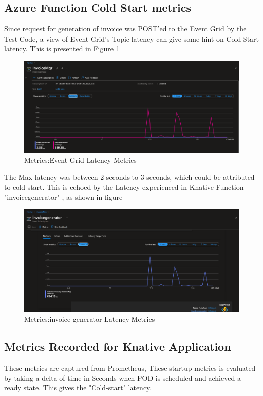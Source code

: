 \documentclass{article}
\begin{document}
\begin{flushleft}
\subsection{Azure Function Cold Start metrics}
Since request for generation of invoice was POST'ed to the Event Grid by the Test Code, a view of Event Grid's Topic latency can give some hint on Cold Start latency. This is presented in Figure \ref{event_grid_latency_metrics}

\begin{figure}[h]
    \centering
    \includegraphics[scale=0.20]{images/AzurePerfCapture/eventgrid-topic-latency.PNG}
    \caption{Metrics:Event Grid Latency Metrics}
    \label{event_grid_latency_metrics}
\end{figure}
\par
The Max latency was between 2 seconds to 3 seconds, which could be attributed to cold start. This is echoed by the Latency experienced in Knative Function "invoicegenerator" , as shown in figure 
\begin{figure}[h]
    \centering
    \includegraphics[scale=0.20]{images/AzurePerfCapture/invoicegenerator-event-latency.PNG}
    \caption{Metrics:invoice generator Latency Metrics}
    \label{invoice-generator_latency_metrics}
\end{figure}
\par
\subsection{Metrics Recorded for Knative Application}
These metrics are captured from Prometheus, These startup metrics is evaluated by taking a delta of time in Seconds when POD is scheduled and achieved a ready state. This gives the "Cold-start" latency.

\end{flushleft}
\end{document}
